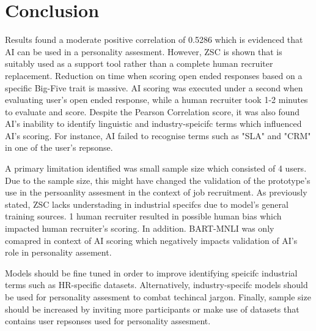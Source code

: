 \section{Conclusion}
\label{sec:Con}
\par Results found a moderate positive correlation of 0.5286 which is evidenced that AI can be used in a personality assesment. However, ZSC is shown that is suitably used as a support tool rather than a complete human recruiter replacement. Reduction on time when scoring open ended responses based on a specific Big-Five trait is massive. AI scoring was executed under a second when evaluating user's open ended response, while a human recruiter took 1-2 minutes to evaluate and score. Despite the Pearson Correlation score, it was also found AI's inability to identify linguistic and industry-speicifc terms which influenced AI's scoring. For instance, AI failed to recognise terms such as "SLA" and "CRM" in one of the user's repsonse. 

\par A primary limitation identified was small sample size which consisted of 4 users. Due to the sample size, this might have changed the validation of the prototype's use in the persoanlity assesment in the context of job recruitment. As previously stated, ZSC lacks understading in industrial specifcs due to model's general training sources. 1 human recruiter resulted in possible human bias which impacted human recruiter's scoring. In addition. BART-MNLI was only comapred in context of AI scoring which negatively impacts validation of AI's role in personality assement. 

\par Models should be fine tuned in order to improve identifying speicifc industrial terms such as HR-specific datasets. Alternatively, industry-specifc models should be used for personality assesment to combat techincal jargon. Finally, sample size should be increased by inviting more participants or make use of datasets that contains user repsonses used for personality assesment.
